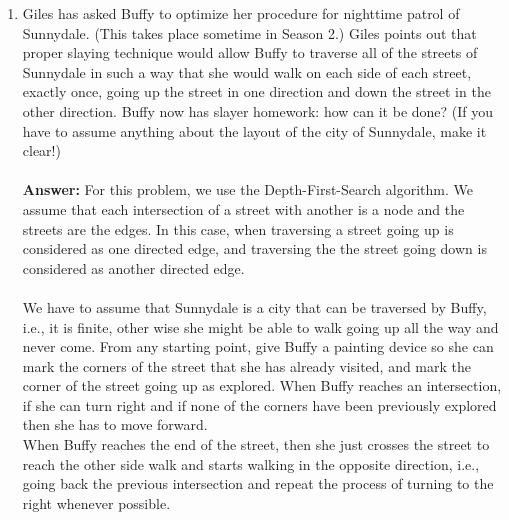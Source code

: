 \documentclass[12pt]{scrartcl}
\begin{document}
\begin{enumerate}
	
	\item Giles has asked Buffy to optimize her procedure for nighttime patrol of Sunnydale. (This takes place sometime in Season 2.) Giles points out that proper slaying technique would allow Buffy to traverse all of the streets of Sunnydale in such a way that she would walk on each side of each street, exactly once, going up the street in one direction and down the street in the other direction. Buffy now has slayer homework: how can it be done? (If you have to assume anything about the layout of the city of Sunnydale, make it clear!)\\
	\\
	\textbf{Answer: } For this problem, we use the Depth-First-Search algorithm. We assume that each intersection of a street with another is a node and the streets are the edges. In this case, when traversing a street going up is considered as one directed edge, and traversing the the street going down is considered as another directed edge. \\
	\\
	We have to assume that Sunnydale is a city that can be traversed by Buffy, i.e., it is finite, other wise she might be able to walk going up all the way and never come. From any starting point, give Buffy a painting device so she can mark the corners of the street that she has already visited, and mark the corner of the street going up as explored. When Buffy reaches an intersection, if she can turn right and if none of the corners have been previously explored then she has to move forward.\\
	 When Buffy reaches the end of the street, then she just crosses the street to reach the other side walk and starts walking in the opposite direction, i.e., going back the previous intersection and repeat the process of turning to the right whenever possible.
	

\end{enumerate}
\end{document}
